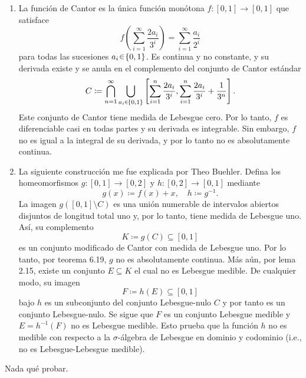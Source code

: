 \setcounter{neje}{23}
\begin{nejer}[incisos (i) y (ii)]
\begin{enumerate}[label = (\roman*), leftmargin=1.8em]
\item La función de Cantor es la única función monótona $f \colon [0,1] \to [0,1]$ que satisface
$$
f \left( \sum_{i=1}^\infty \frac{2a_i}{3^i} \right) = \sum_{i=1}^\infty \frac{a_i}{2^i}
$$
para todas las sucesiones $a_i \en \{0, 1\}$. Es continua y no constante, y su derivada existe y se anula en el complemento del conjunto de Cantor estándar
$$
C \coloneq \bigcap_{n=1}^\infty \bigcup_{a_i \en \{0, 1\}} \left[ \sum_{i=1}^n \frac{2a_i}{3^i}, \sum_{i=1}^n \frac{2a_i}{3^i} + \frac{1}{3^n} \right].
$$
Este conjunto de Cantor tiene medida de Lebesgue cero. Por lo tanto, $f$ es diferenciable casi en todas partes y su derivada es integrable. Sin embargo, $f$ no es igual a la integral de su derivada, y por lo tanto no es absolutamente continua.

\item La siguiente construcción me fue explicada por Theo Buehler. Defina los homeomorfismos $g \colon [0,1] \to [0,2]$ y $h \colon [0,2] \to [0,1]$ mediante
$$
g(x) \coloneq f(x) + x, \quad h \coloneq g^{-1}.
$$
La imagen $g( [0,1] \setminus C)$ es una unión numerable de intervalos abiertos disjuntos de longitud total uno y, por lo tanto, tiene medida de Lebesgue uno. Así, su complemento 
\[K \coloneq g(C) \subseteq  [0,1]\] 
es un conjunto modificado de Cantor con medida de Lebesgue uno. Por lo tanto, por teorema 6.19, $g$ no es absolutamente continua. Más aún, por lema 2.15, existe un conjunto $E \subseteq K$ el cual no es Lebesgue medible. De cualquier modo, su imagen
\[
F \coloneq h(E) \subseteq [0,1]
\]
bajo $h$ es un subconjunto del conjunto Lebesgue-nulo $C$ y por tanto es un conjunto Lebesgue-nulo. Se sigue que $F$ es un conjunto Lebesgue medible y $E = h^{-1}(F)$ no es Lebesgue medible. Esto prueba que la función $h$ no es medible con respecto a la $\sigma$-álgebra de Lebesgue en dominio y codominio (i.e., no es Lebesgue-Lebesgue medible). 
\end{enumerate}
\end{nejer}
\begin{sol}
Nada qué probar.
\end{sol}
